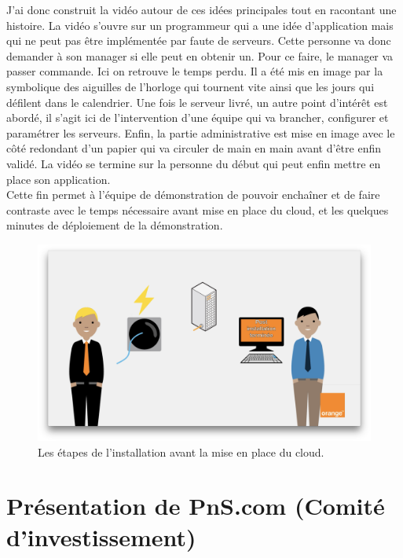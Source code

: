 J'ai donc construit la vidéo autour de ces idées principales tout en racontant une histoire. La vidéo s'ouvre sur un programmeur qui a une idée d'application mais qui ne peut pas être implémentée par faute de serveurs. Cette personne va donc demander à son manager si elle peut en obtenir un. Pour ce faire, le manager va passer commande. Ici on retrouve le temps perdu. Il a été mis en image par la symbolique des aiguilles de l'horloge qui tournent vite ainsi que les jours qui défilent dans le calendrier. Une fois le serveur livré, un autre point d'intérêt est abordé, il s'agit ici de l'intervention d'une équipe qui va brancher, configurer et paramétrer les serveurs. Enfin, la partie administrative est mise en image avec le côté redondant d'un papier qui va circuler de main en main avant d'être enfin validé. La vidéo se termine sur la personne du début qui peut enfin mettre en place son application.\\

Cette fin permet à l'équipe de démonstration de pouvoir enchaîner et de faire contraste avec le temps nécessaire avant mise en place du cloud, et les quelques minutes de déploiement de la démonstration.

\begin{figure}[htp]
  \centering
  \includegraphics[width=15cm]{images/cd/cd.png}
  \caption{Les étapes de l'installation avant la mise en place du cloud.}
  \label{comite}
\end{figure}



\section{Présentation de PnS.com (Comité d'investissement)}

